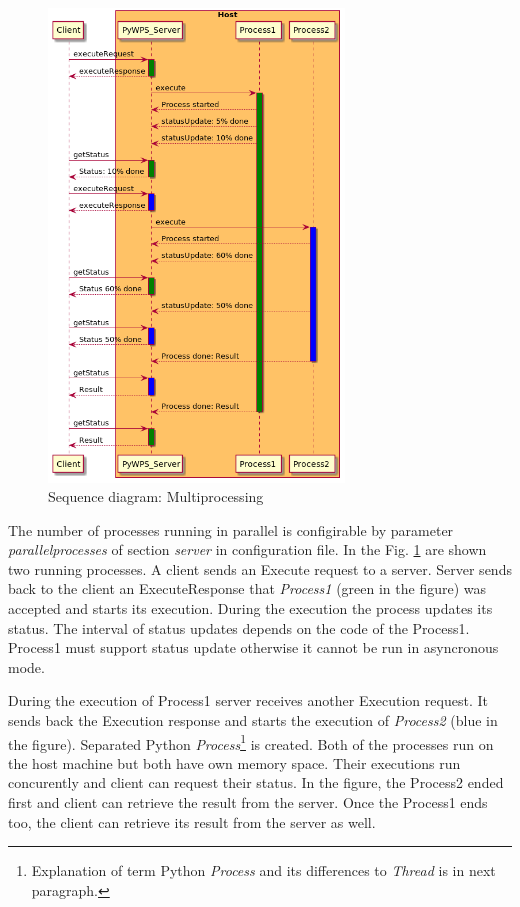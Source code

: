 \documentclass[12pt,a4paper]{article}
\begin{document}
\begin{figure}[h!]
\centering
\includegraphics[width=0.7\textwidth]{img/Diag_multiprocessing.png}
\caption{Sequence diagram: Multiprocessing}
\label{fig:Diag_multiprocessing}
\end{figure}

The number of processes running in parallel is configirable by parameter \textit{parallelprocesses} of section \textit{server} in 
configuration file. In the Fig. \ref{fig:Diag_multiprocessing} are shown two running processes. A client sends an Execute request to
a server. Server sends back to the client an ExecuteResponse that \textit{Process1} (green in the figure) was accepted and starts its 
execution. During the execution the process updates its status. The interval of status updates depends on the code of the Process1.
Process1 must support status update otherwise it cannot be run in asyncronous mode.

During the execution of Process1 server receives another Execution request. It sends back the Execution response and starts the execution
of \textit{Process2} (blue in the figure). Separated Python \textit{Process}\footnote{Explanation of term Python \textit{Process} and its
differences to \textit{Thread} is in next paragraph.} is created. Both of the processes run on the host machine but both have own memory
space. Their executions run concurently and client can request their status. In the figure, the Process2 ended first and client can retrieve
the result from the server. Once the Process1 ends too, the client can retrieve its result from the server as well.
\end{document}
